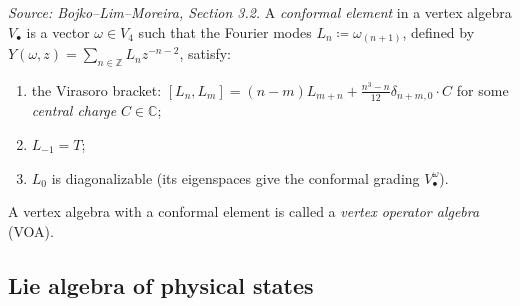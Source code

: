 
\begin{definition}[ConformalElement]
  \label{def:conformal-element}
  \textit{Source: Bojko--Lim--Moreira, Section 3.2.}
  A \emph{conformal element} in a vertex algebra \(V_\bullet\) is a vector
  \(\omega \in V_4\) such that the Fourier modes \(L_n \coloneqq \omega_{(n+1)}\),
  defined by \(Y(\omega, z) = \sum_{n \in \mathbb{Z}} L_n z^{-n-2}\), satisfy:
  \begin{enumerate}
  \item the Virasoro bracket:
        \([L_n, L_m] = (n-m) L_{m+n} + \tfrac{n^3-n}{12} \delta_{n+m,0} \cdot C\)
        for some \emph{central charge} \(C \in \mathbb{C}\);
  \item \(L_{-1} = T\);
  \item \(L_0\) is diagonalizable (its eigenspaces give the conformal grading
        \(V_\bullet^\omega\)).
  \end{enumerate}
  A vertex algebra with a conformal element is called a \emph{vertex operator algebra}
  (VOA).
\end{definition}

\subsection{Lie algebra of physical states}

